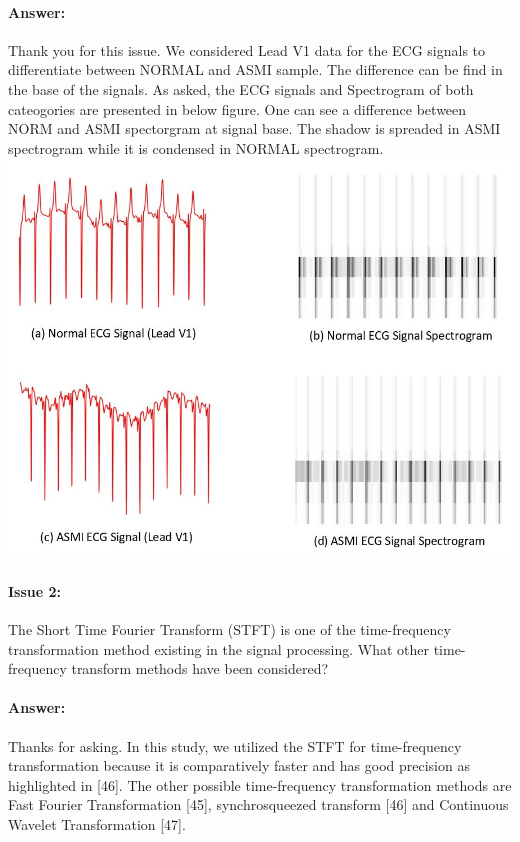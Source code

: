 \documentclass{article}
\begin{document}
\paragraph{Answer:}
Thank you for this issue. We considered Lead V1 data for the ECG signals to differentiate between NORMAL and ASMI sample. The difference can be find in the base of the signals. As asked, the ECG signals and Spectrogram of both cateogories are presented in below figure. One can see a difference between NORM and ASMI spectorgram at signal base. The shadow is spreaded in ASMI spectrogram while it is condensed in NORMAL spectrogram. 
\includegraphics[scale=0.55]{Signal and spectrogram img.JPG}


\paragraph{Issue 2:}
\begin{displayquote}
 The Short Time Fourier Transform (STFT) is one of the time-frequency transformation method existing in the signal processing. What other time-frequency transform methods have been considered?
\end{displayquote}

\paragraph{Answer:}
Thanks for asking. In this study, we utilized the STFT for time-frequency transformation because it is comparatively faster and has good precision as highlighted in [46]. The other possible time-frequency transformation methods are Fast Fourier Transformation [45], synchrosqueezed transform [46] and  Continuous Wavelet Transformation [47]. 
‌
\end{document}
